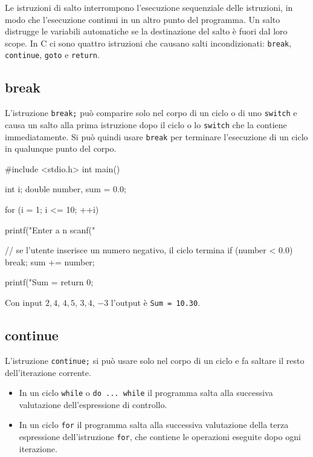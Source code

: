 \documentclass[11pt,a4paper]{article}
\begin{document}
Le istruzioni di salto interrompono l'esecuzione sequenziale delle istruzioni, in modo che l'esecuzione continui in un altro punto del programma. Un salto distrugge le variabili automatiche se la destinazione del salto è fuori dal loro scope. In C ci sono quattro istruzioni che causano salti incondizionati: \lstinline|break|, \lstinline|continue|, \lstinline|goto| e \lstinline|return|.

\subsection{break}

L'istruzione \lstinline|break;| può comparire solo nel corpo di un ciclo o di uno \lstinline|switch| e causa un salto alla prima istruzione dopo il ciclo o lo \lstinline|switch| che la contiene immediatamente. Si può quindi usare \lstinline|break| per terminare l'esecuzione di un ciclo in qualunque punto del corpo.

\begin{esempio}
\begin{codice}
#include <stdio.h>
int main()
{
    int i;
    double number, sum = 0.0;

    for (i = 1; i <= 10; ++i)
    {
        printf("Enter a n%
        scanf("%

        // se l'utente inserisce un numero negativo, il ciclo termina
        if (number < 0.0)
        {
            break;
        }
        sum += number;
    }
    printf("Sum = %
    return 0;
}
\end{codice}
Con input $2{,}4$, $4{,}5$, $3{,}4$, $-3$ l'output è \texttt{Sum = 10.30}.
\end{esempio}

\subsection{continue}

L'istruzione \lstinline|continue;| si può usare solo nel corpo di un ciclo e fa saltare il resto dell'iterazione corrente.
\begin{itemize}
    \item In un ciclo \lstinline|while| o \lstinline|do ... while| il programma salta alla successiva valutazione dell'espressione di controllo.
    \item In un ciclo \lstinline|for| il programma salta alla successiva valutazione della terza espressione dell'istruzione \lstinline|for|, che contiene le operazioni eseguite dopo ogni iterazione.
\end{itemize}
\end{document}
